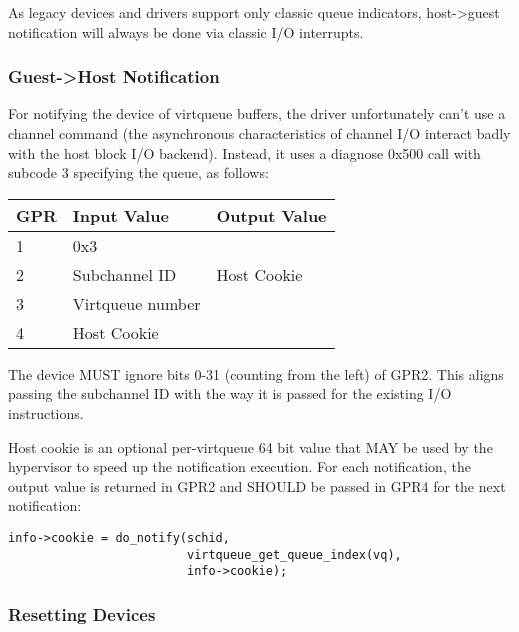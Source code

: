 As legacy devices and drivers support only classic queue indicators,
host->guest notification will always be done via classic I/O interrupts.

\subsubsection{Guest->Host Notification}\label{sec:Virtio Transport Options / Virtio over channel I/O / Device Operation / Guest->Host Notification}

For notifying the device of virtqueue buffers, the driver
unfortunately can't use a channel command (the asynchronous
characteristics of channel I/O interact badly with the host block
I/O backend). Instead, it uses a diagnose 0x500 call with subcode
3 specifying the queue, as follows:

\begin{tabular}{ |l|l|l| }
\hline
GPR  &   Input Value     & Output Value \\
\hline \hline
  1   &       0x3         &              \\
\hline
  2   &  Subchannel ID    & Host Cookie  \\
\hline
  3   & Virtqueue number  &              \\
\hline
  4   &   Host Cookie     &              \\
\hline
\end{tabular}

The device MUST ignore bits 0-31 (counting from the left) of GPR2.
This aligns passing the subchannel ID with the way it is passed
for the existing I/O instructions.

Host cookie is an optional per-virtqueue 64 bit value that MAY be
used by the hypervisor to speed up the notification execution.
For each notification, the output value is returned in GPR2 and
SHOULD be passed in GPR4 for the next notification:

\begin{lstlisting}
info->cookie = do_notify(schid,
                         virtqueue_get_queue_index(vq),
                         info->cookie);
\end{lstlisting}

\subsubsection{Resetting Devices}\label{sec:Virtio Transport Options / Virtio over channel I/O / Device Operation / Resetting Devices}

